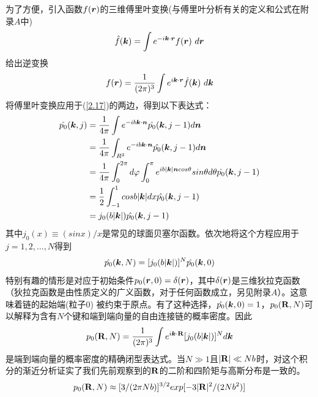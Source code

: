 为了方便，引入函数$f(\bm{r})$的三维傅里叶变换(与傅里叶分析有关的定义和公式在附录$A$中)\\
\begin{equation}
\hat{f}(\bm{k})=\int e^{-i\bm{k} \cdot \bm{r}}f(\bm{r})~d\bm{r}
\label{2.18}
\end{equation}
给出逆变换\\
\begin{equation}
 f(\bm{r})=\frac{1}{(2 \pi)^3} \int e^{i\bm{k} \cdot \bm{r}} \hat{f}(\bm{k})~d\bm{k}
\label{2.19}
\end{equation}
将傅里叶变换应用于(\ref{2.17})的两边，得到以下表达式：\\
\begin{equation}
\begin{aligned}
\hat{p_0}(\bm{k},j)&=\frac{1}{4 \pi} \int e^{-ib\bm{k} \cdot \bm{n}} \hat{p_0}(\bm{k},j-1)d\bm{n} \\&=\frac{1}{4 \pi} \int _{R^3}e^{-ib\bm{k} \cdot \bm{n}} \hat{p_0}(\bm{k},j-1)d\bm{n} \\&=
\frac{1}{4 \pi} \int _{0}^{2 \pi}d \varphi \int _{0}^{\pi} e^{ib|\bm{k}|\bm{n} cos \theta}sin \theta d \theta \hat{p_0}(\bm{k},j-1) \\&=\frac{1}{2} \int _{-1}^{1}cos b|\bm{k}|dx \hat{p_0}(\bm{k},j-1) \\&=j_0(b|\bm{k}|)\hat{p_0}(\bm{k},j-1)
\label{2.20}
\end{aligned}
\end{equation}
其中$j_0(x) \equiv (sinx)/x$是常见的球面贝塞尔函数。依次地将这个方程应用于$j=1,2,\ldots,N$得到\\
\begin{equation}
\hat{p_0}(\bm{k},N)=[j_0(b|\bm{k}|)]^{N}\hat{p_0}(\bm{k},0)
\label{2.21}
\end{equation}
特别有趣的情形是对应于初始条件$p_0(\bm{r},0)=\delta(\bm{r})$，其中$\delta(\bm{r})$是三维狄拉克函数（狄拉克函数是由性质定义的广义函数，对于任何函数成立，另见附录$A$）。这意味着链的起始端(粒子$0$) 被约束于原点。有了这种选择，$\hat{p_0}(\bm{k},0)=1$，$p_0(\mathbf{R},N)$可以解释为含有$N$个键和端到端向量的自由连接链的概率密度。因此\\
\begin{equation}
p_0(\mathbf{R},N)=\frac{1}{(2 \pi)^3 }\int e^{i\bm{k} \cdot \mathbf{R}}[j_0(b|\bm{k}|)]^{N}d\bm{k}
\label{2.22}
\end{equation}
是端到端向量的概率密度的精确闭型表达式。当$N\gg1$且$|\mathbf{R}| \ll Nb $时，对这个积分的渐近分析证实了我们先前观察到的$\mathbf{R}$的二阶和四阶矩与高斯分布是一致的。\\
\begin{equation}
p_0(\mathbf{R},N) \approx [3/(2 \pi Nb)]^{3/2}exp[-3|\mathbf{R}|^2/(2Nb^2)]
\label{2.23}
\end{equation}
